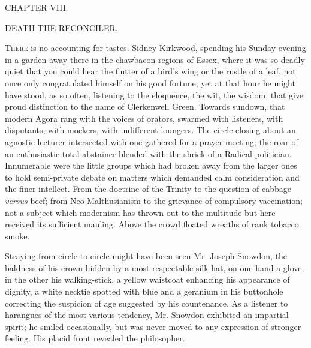 {}

{CHAPTER VIII.}

DEATH THE RECONCILER.

\textsc{There} is no accounting for tastes. Sidney Kirkwood, spending
his Sunday evening in a garden away there in the chawbacon regions of
Essex, where it was so deadly quiet that you could hear the flutter of a
bird's wing or the rustle of a leaf, not once only congratulated himself
on his good fortune; yet at that hour he might have stood, as so often,
listening to the eloquence, the wit, the wisdom, that give proud
distinction to the name of Clerkenwell Green. Towards sundown, that
modern Agora rang with the voices of orators, swarmed with listeners,
with disputants, with mockers, with indifferent loungers. The circle
closing about an agnostic lecturer intersected with one gathered for a
prayer-meeting; the roar of an enthusiastic {}total-abstainer blended
with the shriek of a Radical politician. Innumerable were the little
groups which had broken away from the larger ones to hold semi-private
debate on matters which demanded calm consideration and the finer
intellect. From the doctrine of the Trinity to the question of cabbage
\emph{versus} beef; from Neo-Malthusianism to the grievance of
compulsory vaccination; not a subject which modernism has thrown out to
the multitude but here received its sufficient mauling. Above the crowd
floated wreaths of rank tobacco smoke.

Straying from circle to circle might have been seen Mr. Joseph Snowdon,
the baldness of his crown hidden by a most respectable silk hat, on one
hand a glove, in the other his walking-stick, a yellow waistcoat
enhancing his appearance of dignity, a white necktie spotted with blue
and a geranium in his buttonhole correcting the suspicion of age
suggested by his countenance. As a listener to harangues of the most
various tendency, Mr. Snowdon exhibited an impartial spirit; {}he smiled
occasionally, but was never moved to any expression of stronger feeling.
His placid front revealed the philosopher.

